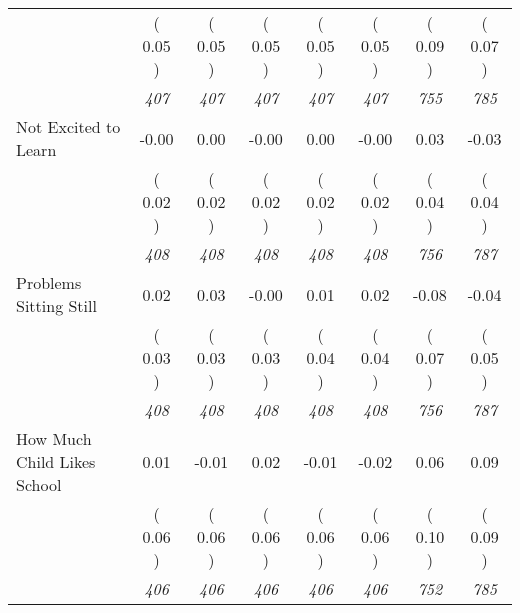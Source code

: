 \begin{tabular}{l c c c c c c c}
& (     0.05 ) & (     0.05 ) & (     0.05 ) & (     0.05 ) & (     0.05 ) & (     0.09 ) & (     0.07 ) \\
& \textit{ 407 } & \textit{ 407 } & \textit{ 407 } & \textit{ 407 } & \textit{ 407 } & \textit{ 755 } & \textit{ 785 } \\
Not Excited to Learn &     -0.00 &      0.00 &     -0.00 &      0.00 &     -0.00 &      0.03 &     -0.03 \\
& (     0.02 ) & (     0.02 ) & (     0.02 ) & (     0.02 ) & (     0.02 ) & (     0.04 ) & (     0.04 ) \\
& \textit{ 408 } & \textit{ 408 } & \textit{ 408 } & \textit{ 408 } & \textit{ 408 } & \textit{ 756 } & \textit{ 787 } \\
Problems Sitting Still &      0.02 &      0.03 &     -0.00 &      0.01 &      0.02 &     -0.08 &     -0.04 \\
& (     0.03 ) & (     0.03 ) & (     0.03 ) & (     0.04 ) & (     0.04 ) & (     0.07 ) & (     0.05 ) \\
& \textit{ 408 } & \textit{ 408 } & \textit{ 408 } & \textit{ 408 } & \textit{ 408 } & \textit{ 756 } & \textit{ 787 } \\
How Much Child Likes School &      0.01 &     -0.01 &      0.02 &     -0.01 &     -0.02 &      0.06 &      0.09 \\
& (     0.06 ) & (     0.06 ) & (     0.06 ) & (     0.06 ) & (     0.06 ) & (     0.10 ) & (     0.09 ) \\
& \textit{ 406 } & \textit{ 406 } & \textit{ 406 } & \textit{ 406 } & \textit{ 406 } & \textit{ 752 } & \textit{ 785 } \\
\bottomrule
\end{tabular}
